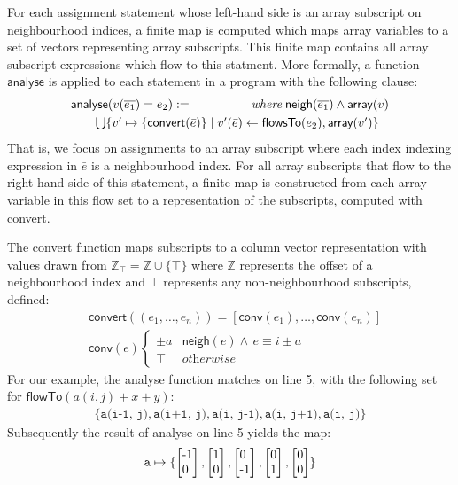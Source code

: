\documentclass[9pt]{sigplanconf}
\theoremstyle{definition}
\newcommand{\neigh}{\textsf{neigh}}
\newcommand{\arrayTy}{\textsf{array}}
\newcommand{\vtwo}[2]{\setlength{\arraycolsep}{0em}
\left[\begin{array}{l}$#1$\\$#2$\end{array}\right]}
\begin{document}
For each assignment statement whose left-hand side is an array
subscript on neighbourhood indices, a finite map is computed which
maps array variables to a set of vectors representing array
subscripts.  This finite map contains all array subscript expressions
which flow to this statment. More formally, a function
$\textsf{analyse}$ is applied to each statement in a program with the
following clause:
%
\begin{align*}
\begin{array}{lr}
\textsf{analyse}(v(\overline{e_1}) = e_2)
 := \qquad\qquad & \textit{where} \; \neigh(\overline{e_1}) \wedge \arrayTy(v)  \\[0.3em]
\multicolumn{2}{l}{\qquad \bigcup\{v' \mapsto \{\textsf{convert}(\bar{e})\} \mid v'(\bar{e}) \leftarrow \mathsf{flowsTo}(e_2),
  \arrayTy(v')\}}
\end{array}
\end{align*}
%
That is, we focus on assignments to an array subscript where each
index indexing expression in $\bar{e}$ is a neighbourhood index.  For
all array subscripts that flow to the right-hand side of this
statement, a finite map is constructed from each array variable
in this flow set to a representation of the subscripts, computed
with \textsf{convert}.

The \textsf{convert} function maps subscripts to a column vector
representation with values drawn from $\mathbb{Z}_\top = \mathbb{Z} \cup \{\top\}$
where $\mathbb{Z}$ represents the offset of a neighbourhood index
and $\top$ represents any non-neighbourhood subscripts, defined:
%
\begin{align*}
& \textsf{convert}((e_1, \ldots, e_n)) = [\textsf{conv}(e_1), \ldots,
  \textsf{conv}(e_n)] \\
& \textsf{conv}(e) \begin{cases}
\pm a & \neigh(e) \wedge \, e \equiv i \pm a \\
\top & \textit{otherwise} 
\end{cases} 
\end{align*}
%
For our example, the \textsf{analyse} function matches on
line 5, with the following set for $\textsf{flowTo}(a(i, j) + x +
  y)$:
%
\begin{align*}
\{\texttt{a(i-1, j)}, \texttt{a(i+1, j)}, \texttt{a(i, j-1)},
  \texttt{a(i, j+1)}, \texttt{a(i, j)}\}
\end{align*}
Subsequently the result of \textsf{analyse} on line 5 yields the map:
\begin{align*}
\texttt{a} \mapsto \{\vtwo{-1}{0}, \vtwo{1}{0},
          \vtwo{0}{-1}, \vtwo{0}{1}, \vtwo{0}{0}\}
\end{align*}
%
\end{document}

